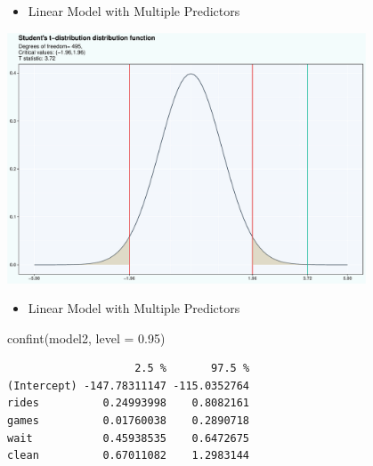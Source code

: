 \documentclass[
  ignorenonframetext,
]{beamer}
\newenvironment{Shaded}{\begin{snugshade}}{\end{snugshade}}
\newcommand{\AttributeTok}[1]{\textcolor[rgb]{0.40,0.45,0.13}{#1}}
\newcommand{\FloatTok}[1]{\textcolor[rgb]{0.68,0.00,0.00}{#1}}
\newcommand{\FunctionTok}[1]{\textcolor[rgb]{0.28,0.35,0.67}{#1}}
\newcommand{\NormalTok}[1]{\textcolor[rgb]{0.00,0.23,0.31}{#1}}
\providecommand{\tightlist}{%
  \setlength{\itemsep}{0pt}\setlength{\parskip}{0pt}}\usepackage{longtable,booktabs,array}
\begin{document}
\begin{frame}{}
\label{section-22}
\begin{itemize}
\tightlist
\item
  Linear Model with Multiple Predictors
\end{itemize}

\begin{center}
\includegraphics[width=0.8\textwidth,height=\textheight]{007_identifying_drivers_of_outcomes_linear_models_files/figure-beamer/unnamed-chunk-20-1.pdf}
\end{center}
\end{frame}

\begin{frame}[fragile]{}
\label{section-23}
\begin{itemize}
\tightlist
\item
  Linear Model with Multiple Predictors
\end{itemize}

\tiny

\begin{Shaded}
\begin{Highlighting}[]
\FunctionTok{confint}\NormalTok{(model2, }\AttributeTok{level =} \FloatTok{0.95}\NormalTok{)}
\end{Highlighting}
\end{Shaded}

\begin{verbatim}
                    2.5 %       97.5 %
(Intercept) -147.78311147 -115.0352764
rides          0.24993998    0.8082161
games          0.01760038    0.2890718
wait           0.45938535    0.6472675
clean          0.67011082    1.2983144
\end{verbatim}
\end{frame}
\end{document}
